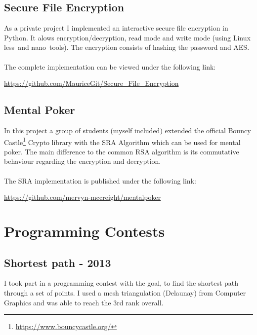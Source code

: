 \documentclass[a4paper, 12pt]{article}
\begin{document}
\subsection{Secure File Encryption}

As a private project I implemented an interactive secure file encryption in Python. It alows encryption/decryption, read mode and write mode (using Linux \glq less\grq\  and \glq nano\grq\ tools). The encryption consists of hashing the password and AES.
\\
\\
The complete implementation can be viewed under the following link:

\begin{center}
	\url{https://github.com/MauriceGit/Secure_File_Encryption}
\end{center}


\subsection{Mental Poker}

In this project a group of students (myself included) extended the official Bouncy Castle\footnote{\url{https://www.bouncycastle.org/}} Crypto library with the SRA Algorithm which can be used
for mental poker. The main difference to the common RSA algorithm is its commutative behaviour regarding 
the encryption and decryption.
\\
\\
The SRA implementation is published under the following link:

\begin{center}
	\url{https://github.com/mervyn-mccreight/mentalpoker}
\end{center}

\newpage

\section{Programming Contests}

\subsection{Shortest path - 2013}

I took part in a programming contest with the goal, to find the shortest path through a set of points.
I used a mesh triangulation (Delaunay) from Computer Graphics and was able to reach the 3rd rank
overall.
\end{document}
